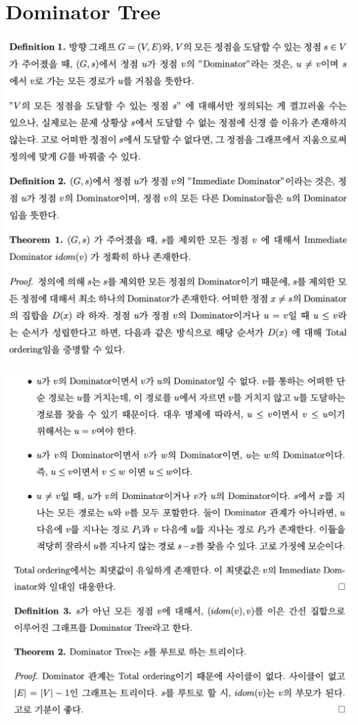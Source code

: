 \section{Dominator Tree}
\begin{minipage}{90mm}
\includegraphics[width=\textwidth]{content/various/d1}
\end{minipage}
\begin{minipage}{90mm}
\includegraphics[width=\textwidth]{content/various/d2}
\end{minipage}

